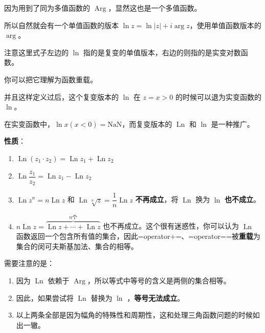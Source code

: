 因为用到了同为多值函数的
\(\operatorname{Arg}\)，显然这也是一个多值函数。

所以自然就会有一个单值函数的版本
\(\ln z = \ln |z|+i\operatorname{arg}z\)，使用单值函数版本的
\(\operatorname{arg}\)。

\begin{tcolorbox}[title={Note},colback=red!5!white
,colframe=red!75!black
,colbacktitle=yellow!50!red
,coltitle=red!25!black, fonttitle=\bfseries,subtitle style={boxrule=0.4pt, colback=yellow!50!red!25!white}]
注意这里式子左边的 \(\ln\)
指的是复变的单值版本，右边的则指的是实变对数函数。

你可以把它理解为函数重载。

并且这样定义过后，这个复变版本的 \(\ln\) 在 \(z=x>0\) 的时候可以退为实变函数的 \(\ln\)。

\end{tcolorbox}

在实变函数中，\(\ln x(x<0)=\text{NaN}\)，而复变版本的
\(\operatorname{Ln}\) 和 \(\ln\) 是一种推广。

\textbf{性质}：

\begin{enumerate}
\item \(\operatorname{Ln}(z_1 \cdot z_2)=\operatorname{Ln}z_1+\operatorname{Ln}z_2\)
\item \(\operatorname{Ln}\dfrac{z_1}{z_2}=\operatorname{Ln}z_1-\operatorname{Ln}z_2\)
\item \(\operatorname{Ln}z^n=n\operatorname{Ln}z\) 和
\(\operatorname{Ln}\sqrt[n]{z}=\dfrac{1}{n}\operatorname{Ln}z\)
\textbf{不再成立}，将 \(\operatorname{Ln}\) 换为 \(\ln\) \textbf{也不成立}。
\item \(n\operatorname{Ln}z=\overbrace{\operatorname{Ln}z+\cdots+\operatorname{Ln}z}^{n 个}\)
也不再成立。这个很有迷惑性，你可以认为 \(\operatorname{Ln}\)
函数返回一个包含所有值的集合，因此=operator+=、=operator==被\textbf{重载}为集合的闵可夫斯基加法、集合的相等。
\end{enumerate}

\begin{tcolorbox}[title={Note},colback=red!5!white
,colframe=red!75!black
,colbacktitle=yellow!50!red
,coltitle=red!25!black, fonttitle=\bfseries,subtitle style={boxrule=0.4pt, colback=yellow!50!red!25!white}]
需要注意的是：

\begin{enumerate}
\item 因为 \(\operatorname{Ln}\) 依赖于 \(\operatorname{Arg}\)，所以等式中等号的含义是两侧的集合相等。
\item 因此，如果尝试将 \(\operatorname{Ln}\) 替换为 \(\ln\) ，\textbf{等号无法成立}。
\item 以上两条全部是因为幅角的特殊性和周期性，这和处理三角函数问题的时候如出一辙。
\end{enumerate}

\end{tcolorbox}


